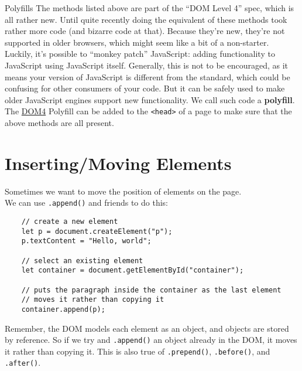 \begin{infobox}{Polyfills}
    The methods listed above are part of the ``DOM Level 4'' spec, which is all rather new. Until quite recently doing the equivalent of these methods took rather more code (and bizarre code at that). Because they're new, they're not supported in older browsers, which might seem like a bit of a non-starter.
    \\

    Luckily, it's possible to ``monkey patch'' JavaScript: adding functionality to JavaScript using JavaScript itself. Generally, this is not to be encouraged, as it means your version of JavaScript is different from the standard, which could be confusing for other consumers of your code. But it can be safely used to make older JavaScript engines support new functionality. We call such code a \textbf{polyfill}.\footnotemark
    \\

    The \href{https://github.com/WebReflection/dom4}{DOM4} Polyfill can be added to the \texttt{<head>} of a page to make sure that the above methods are all present.
\end{infobox}


\pagebreak

\section{Inserting/Moving Elements}

Sometimes we want to move the position of elements on the page.
\\

We can use \texttt{.append()} and friends to do this:

\begin{verbatim}
    // create a new element
    let p = document.createElement("p");
    p.textContent = "Hello, world";

    // select an existing element
    let container = document.getElementById("container");

    // puts the paragraph inside the container as the last element
    // moves it rather than copying it
    container.append(p);
\end{verbatim}

Remember, the DOM models each element as an object, and objects are stored by reference. So if we try and \texttt{.append()} an object already in the DOM, it moves it rather than copying it. This is also true of \texttt{.prepend()}, \texttt{.before()}, and \texttt{.after()}.


